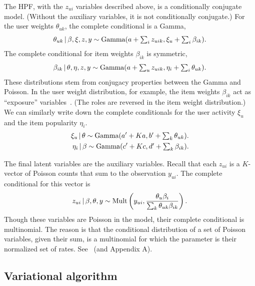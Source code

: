 \documentclass{sig-alternate}
\begin{document}
The HPF, with the $z_{ui}$ variables described above, is a
conditionally conjugate model.  (Without the auxiliary variables, it
is not conditionally conjugate.) For the user weights $\theta_{uk}$,
the complete conditional is a Gamma,
\begin{equation}
  \label{eq:user-weight-cc}
  \theta_{uk} \,\vert\, \beta, \xi, z, y \sim
  \textrm{Gamma}(a + \textstyle \sum_{i} z_{uik}, \xi_u + \sum_{i} \beta_{ik}).
\end{equation}
The complete conditional for item weights $\beta_{ik}$ is symmetric,
\begin{equation}
  \label{eq:item-weight-cc}
  \beta_{ik} \,\vert\, \theta, \eta, z, y \sim
  \textrm{Gamma}(a + \textstyle \sum_{u} z_{uik}, \eta_i + \sum_{i} \theta_{uk}).
\end{equation}
These distributions stem from conjugacy properties between the Gamma
and Poisson. In the user weight distribution, for example, the item
weights $\beta_{ik}$ act as ``exposure'' variables~\cite{Gelman:1995}.
(The roles are reversed in the item weight distribution.) We can
similarly write down the complete conditionals for the user activity
$\xi_u$ and the item popularity $\eta_i$.
\begin{align}
  \label{eq:user-weight-cc}
  \xi_{u} \,\vert\, \theta \sim
  \textrm{Gamma}(a' + \textstyle Ka, b' + \sum_{k} \theta_{uk}).\nonumber\\
  \eta_{i} \,\vert\, \beta \sim
  \textrm{Gamma}(c' + \textstyle Kc, d' + \sum_{k} \beta_{ik}).\nonumber\\
\end{align}

The final latent variables are the auxiliary variables.  Recall that
each $z_{ui}$ is a $K$-vector of Poisson counts that sum to the
observation $y_{ui}$. The complete conditional for this vector is
\begin{equation}
  \label{eq:aux-cc}
  z_{ui} \,\vert\, \beta, \theta, y \sim \textrm{Mult}\left(y_{ui}, \frac{\theta_{u} 
      \beta_{i}}{\textstyle \sum_{k} \theta_{uk} \beta_{ik}}\right).
\end{equation}
Though these variables are Poisson in the model, their complete
conditional is multinomial.  The reason is that the conditional
distribution of a set of Poisson variables, given their sum, is a
multinomial for which the parameter is their normalized set of rates.
See~\cite{Johnson:2005} (and Appendix A).

\subsection{Variational algorithm}
\end{document}
